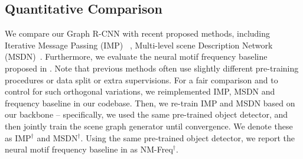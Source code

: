 \subsection{Quantitative Comparison}
\begin{table}[t]
\footnotesize
\setlength{\tabcolsep}{2.5pt} 
\center
{}
\caption{Comparison on Visual Genome test set \cite{krishna2017visual}. We reimplemented IMP \cite{xu2017scene} and MSDN \cite{li2017scene} using the same object detection backbone for fair comparison.}
\label{Table:Exp_main}
\end{table}

We compare our Graph R-CNN with recent proposed methods, including Iterative Message Passing (IMP) ~\cite{xu2017scene}, Multi-level scene Description Network (MSDN)~\cite{li2017scene}. Furthermore, we evaluate the neural motif frequency baseline proposed in \cite{zellers2017neural}. Note that previous methods often use slightly different pre-training procedures or data split or extra supervisions. For a fair comparison and to control for such orthogonal variations, we reimplemented IMP, MSDN and frequency baseline in our codebase. Then, we re-train IMP and MSDN based on our backbone -- specifically, we used the same pre-trained object detector, and then jointly train the scene graph generator until convergence. We denote these as IMP$^\dagger$ and MSDN$^\dagger$. Using the same pre-trained object detector, we report the neural motif frequency baseline in \cite{zellers2017neural} as NM-Freq$^\dagger$.

